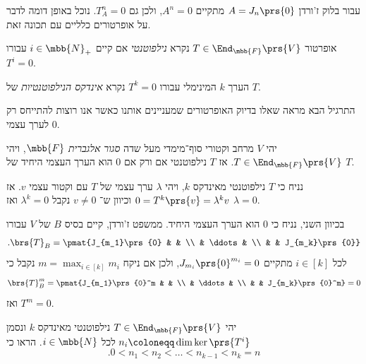 \documentclass[a4paper,10pt,twoside,openany]{book}
\begin{document}
עבור בלוק ז'ורדן
$A = J_n\prs{0}$
מתקיים
$A^n = 0$,
ולכן גם
$T_A^n = 0$.
נוכל באופן דומה לדבר על אופרטורים כלליים עם תכונה זאת.

\begin{definition}
אופרטור
$T \in \End_{\mbb{F}}\prs{V}$
נקרא
\emph{נילפוטנטי}
אם קיים
$i \in \mbb{N}_+$
עבורו
$T^i = 0$.

הערך
$k$
המינימלי עבורו
$T^k = 0$
נקרא
\emph{אינדקס הנילפוטנטיות}
של
$T$.
\end{definition}

התרגיל הבא מראה שאלו בדיוק האופרטורים שמעניינים אותנו כאשר אנו רוצות להתייחס רק לערך עצמי
$0$.

\begin{exercisechap}
יהי
$V$
מרחב וקטורי סוף־מימדי מעל שדה
\emph{סגור אלגברית}
$\mbb{F}$,
ויהי
$T \in \End_{\mbb{F}}\prs{V}$.
אז
$T$
נילפוטנטי אם ורק אם
$0$
הוא הערך העצמי היחיד של
$T$.
\end{exercisechap}

\begin{solution}
נניח כי
$T$
נילפוטנטי מאינדקס
$k$, ויהי
$\lambda$
ערך עצמי של
$T$
עם וקטור עצמי
$v$.
אז
$0 = T^k\prs{v} = \lambda^k v$
וכיוון ש־%
$v \neq 0$
נקבל
$\lambda^k = 0$
ואז
$\lambda = 0$.

בכיוון השני, נניח כי
$0$
הוא הערך העצמי היחיד.
ממשפט ז'ורדן, קיים בסיס
$B$
של
$V$
עבורו
\begin{align*}
\text{.} \brs{T}_B = \pmat{J_{m_1}\prs{0} & & \\ & \ddots & \\ & & J_{m_k}\prs{0}}
\end{align*}
לכל
$i \in [k]$
מתקיים
$J_{m_i}\prs{0}^{m_i} = 0$,
ולכן אם ניקח
$m = \max_{i \in [k]} m_i$
נקבל כי
\begin{align*}
\brs{T}_B^m = \pmat{J_{m_1}\prs{0}^m & & \\ & \ddots & \\ & & J_{m_k}\prs{0}^m} = 0
\end{align*}
ואז
$T^m = 0$.
\end{solution}

\begin{exercisechap}
יהי
$T \in \End_{\mbb{F}}\prs{V}$
נילפוטנטי מאינדקס
$k$
ונסמן
$n_i \coloneqq \dim \ker\prs{T^i}$
לכל
$i \in \mbb{N}$.
הראו כי
\[\text{.} 0 < n_1 < n_2 < \ldots < n_{k-1} < n_k = n\]
\end{exercisechap}
\end{document}
